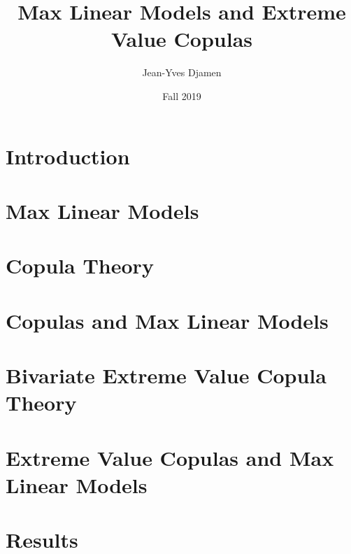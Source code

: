 \documentclass[12pt]{article}
\title{Max Linear Models and Extreme Value Copulas}
\author{Jean-Yves Djamen }
\date{Fall 2019}
\theoremstyle{definition}
\theoremstyle{definition}
\begin{document}
\maketitle
\tableofcontents{}
\pagebreak

\cite{latex2e}
\section{Introduction}

\pagebreak

\section{Max Linear Models}

\pagebreak

\section{Copula Theory}

\pagebreak

\section{Copulas and Max Linear Models}

\pagebreak

\section{Bivariate Extreme Value Copula Theory}

\pagebreak

\section{Extreme Value Copulas and Max Linear Models}

\pagebreak

\section{Results}



\end{document}
